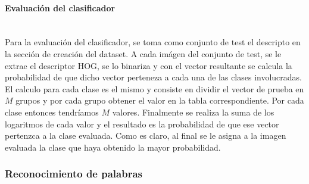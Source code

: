 		\paragraph{Evaluación del clasificador} ~\\

			Para la evaluación del clasificador, se toma como conjunto de test el descripto en la sección de creación del dataset. A cada imágen del conjunto de test, se le extrae el descriptor HOG, se lo binariza y con el vector resultante se calcula la probabilidad de que dicho vector perteneza a cada una de las clases involucradas. El calculo para cada clase es el mismo y consiste en dividir el vector de prueba en $M$ grupos y por cada grupo obtener el valor en la tabla correspondiente. Por cada clase entonces tendríamos $M$ valores. Finalmente se realiza la suma de los logaritmos de cada valor y el resultado es la probabilidad de que ese vector pertenzca a la clase evaluada. Como es claro, al final se le asigna a la imagen evaluada la clase que haya obtenido la mayor probabilidad.

	\subsubsection{Reconocimiento de palabras}


